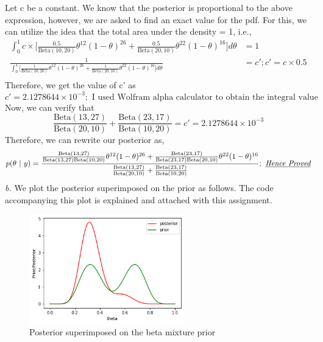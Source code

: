\documentclass[11pt]{article}
\begin{document}
Let c be a constant. We know that the posterior is proportional to the above expression, however, we are asked to find an exact value for the pdf. For this, we can utilize the idea that the total area under the density = 1, i.e.,
\begin{equation}
  \nonumber
  \begin{aligned}
    \int_{0}^{1} c \times \bigg[\frac{0.5}{\text{Beta}(10,20)}\theta^{12}(1-\theta)^{26} + \frac{0.5}{\text{Beta}(20,10)}\theta^{22}(1-\theta)^{16}\bigg] d\theta & = 1\\
    \frac{1}{\int_{0}^{1} \bigg[\frac{1}{\text{Beta}(10,20)}\theta^{12}(1-\theta)^{26} + \frac{1}{\text{Beta}(20,10)}\theta^{22}(1-\theta)^{16}\bigg] d\theta} & = c'; c' = c \times 0.5\\
  \end{aligned}
\end{equation}
Therefore, we get the value of c' as
\begin{equation}
  \nonumber
   c' = 2.1278644 \times 10^{-3}; \text{ I used Wolfram alpha calculator to obtain the integral value}
\end{equation}
Now, we can verify that
\begin{equation}
  \nonumber
  \frac{\text{Beta}(13,27)}{\text{Beta}(20,10)} + \frac{\text{Beta}(23,17)}{\text{Beta}(10,20)} = c' = 2.1278644 \times 10^{-3}
\end{equation}
Therefore, we can rewrite our posterior as,
\begin{equation}
  \nonumber
  p(\theta \text{ }|\text{ } y) = \frac{\frac{\text{Beta}(13,27)}{\text{Beta}(13,27)\text{Beta}(10,20)}\theta^{12}(1-\theta)^{26} + \frac{\text{Beta}(23,17)}{\text{Beta}(23,17)\text{Beta}(20,10)}\theta^{22}(1-\theta)^{16}}{\frac{\text{Beta}(13,27)}{\text{Beta}(20,10)} + \frac{\text{Beta}(23,17)}{\text{Beta}(10,20)}}; \text{\emph{ \underline{Hence Proved}}}
\end{equation}
\emph{b.} We plot the posterior superimposed on the prior as follows. The code accompanying this plot is explained and attached with this assignment.
\begin{figure}[H]
  \centering
  \includegraphics[width = 0.6\textwidth]{q3b.png}
  \caption{Posterior superimposed on the beta mixture prior}
\end{figure}
\end{document}
